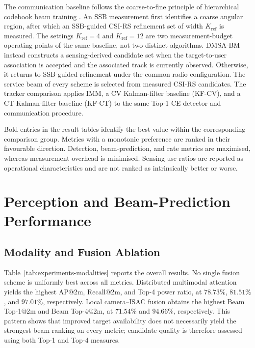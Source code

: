The communication baseline follows the coarse-to-fine principle of
hierarchical codebook beam training \cite{xiao2016hierarchicalcodebook}.  An
SSB measurement first identifies a coarse angular region, after which an
SSB-guided CSI-RS refinement set of width \(K_{\mathrm{ref}}\) is measured.
The settings \(K_{\mathrm{ref}}=4\) and \(K_{\mathrm{ref}}=12\) are two
measurement-budget operating points of the same baseline, not two distinct
algorithms.  DMSA-BM instead constructs a sensing-derived candidate set when
the target-to-user association is accepted and the associated track is
currently observed.  Otherwise, it returns to SSB-guided refinement under the
common radio configuration.  The service beam of every scheme is selected
from measured CSI-RS candidates.  The tracker comparison applies IMM, a
CV Kalman-filter baseline (KF-CV), and a CT Kalman-filter baseline (KF-CT) to
the same Top-1 CE detector and communication procedure.

Bold entries in the result tables identify the best value within the
corresponding comparison group.  Metrics with a monotonic preference are ranked
in their favourable direction.  Detection, beam-prediction, and rate metrics are
maximised, whereas measurement overhead is minimised.  Sensing-use ratios are
reported as operational characteristics and are not ranked as intrinsically
better or worse.

\section{Perception and Beam-Prediction Performance}
\label{sec:experiments-perception}

\subsection{Modality and Fusion Ablation}
\label{subsec:experiments-modality-fusion}

Table~\ref{tab:experiments-modalities} reports the overall results.  No single
fusion scheme is uniformly best across all metrics.  Distributed multimodal
attention yields the highest AP@2m, Recall@2m, and Top-4 power ratio, at
\(78.73\%\), \(81.51\%\), and \(97.01\%\), respectively.  Local
camera--ISAC fusion obtains the highest Beam Top-1@2m and Beam Top-4@2m, at
\(71.54\%\) and \(94.66\%\), respectively.  This pattern shows that improved
target availability does not necessarily yield the strongest beam ranking on
every metric; candidate quality is therefore assessed using both Top-1 and
Top-4 measures.

